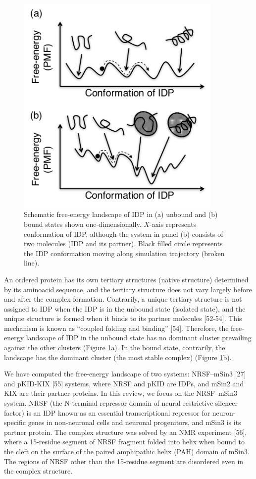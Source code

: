 \begin{figure}
  \centering
  \includegraphics[width=10cm]{../enhance_rev/figures/fel_idps.pdf}
  \caption{\label{fig:fel_idps.pdf} Schematic free-energy landscape of IDP in (a) unbound and (b) bound states shown one-dimensionally. $X$-axis represents conformation of IDP, although the system in panel (b) consists of two molecules (IDP and its partner). Black filled circle represents the IDP conformation moving along simulation trajectory (broken line).}
\end{figure}
An ordered protein has its own tertiary structures (native structure) determined by its aminoacid sequence, and the tertiary structure does not vary largely before and after the complex formation. Contrarily, a unique tertiary structure is not assigned to IDP when the IDP is in the unbound state (isolated state), and the unique structure is formed when it binds to its partner molecules [52-54]. This mechanism is known as “coupled folding and binding” [54]. Therefore, the free-energy landscape of IDP in the unbound state has no dominant cluster prevailing against the other clusters (Figure \ref{fig:fel_idps.pdf}a). In the bound state, contrarily, the landscape has the dominant cluster (the most stable complex) (Figure \ref{fig:fel_idps.pdf}b).

We have computed the free-energy landscape of two systems: NRSF–mSin3 [27] and pKID-KIX [55] systems, where NRSF and pKID are IDPs, and mSin2 and KIX are their partner proteins. In this review, we focus on the NRSF–mSin3 system. NRSF (the N-terminal repressor domain of neural restrictive silencer factor) is an IDP known as an essential transcriptional repressor for neuron-specific genes in non-neuronal cells and neuronal progenitors, and mSin3 is its partner protein. The complex structure was solved by an NMR experiment [56], where a 15-residue segment of NRSF fragment folded into helix when bound to the cleft on the surface of the paired amphipathic helix (PAH) domain of mSin3. The regions of NRSF other than the 15-residue segment are disordered even in the complex structure.


